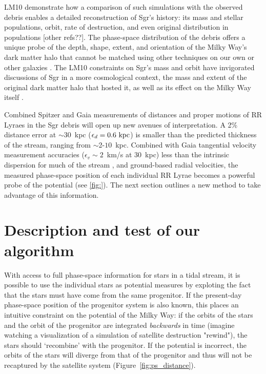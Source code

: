 \documentclass[preprint]{aastex}
\begin{document}
LM10 demonstrate how a comparison of such simulations with the
observed debris enables a detailed reconstruction of Sgr's history:  
its mass and stellar populations, orbit, rate of destruction, and
even original distribution in populations [other refs??]. The phase-space distribution of the debris offers a unique probe of
the depth, shape, extent, and orientation of the Milky Way's dark
matter halo that cannot be matched using other techniques on our own
or other galaxies \citep[e.g.,][]{ibata01}. The LM10 constraints on
Sgr's mass and orbit have invigorated discussions of Sgr in a more
cosmological context, the mass and extent of the original dark matter
halo that hosted it, as well as its effect on the Milky Way itself
\citep{bailin03,purcell11,micheldansac11,gomez12}.

Combined Spitzer and Gaia measurements of distances and proper
motions of RR Lyraes in the Sgr debris will open up new avenues of
interpretation. A 2\% distance error at $\sim$30~kpc ($\epsilon_{d}=0.6~{\rm kpc}$) is smaller than
the predicted thickness of the stream, ranging from
$\sim$2-$10$~kpc. Combined with Gaia tangential velocity measurement
accuracies ($\epsilon_{v}\sim2$~km/s at 30~kpc) less than the intrinsic dispersion
for much of the stream \citep[$\sigma_v\sim10$~km/s;][]{majewski04}, and ground-based radial
velocities, the measured phase-space
position of each individual RR Lyrae becomes a
powerful probe of the potential (see \ref{fig:}). The next section outlines a new
method to take advantage of this information.

\section{Description and test of our algorithm}
\label{sec:method}
With access to full phase-space information for stars in a tidal
stream, it is possible to use the individual stars as
potential measures by exploting the fact that the stars must have come
from the same progenitor. If the present-day phase-space position of the
progenitor system is also known, this places an intuitive constraint on
the potential of the Milky Way: if the orbits of the stars and the
orbit of the progenitor are integrated \emph{backwards} in time
(imagine watching a visualization of a simulation of satellite destruction "rewind"), the
stars should `recombine' with the progenitor. If the potential is
incorrect, the orbits of the stars will diverge from that of the
progenitor and thus will not be recaptured by the satellite system (Figure~\ref{fig:ps_distance}).
\end{document}
